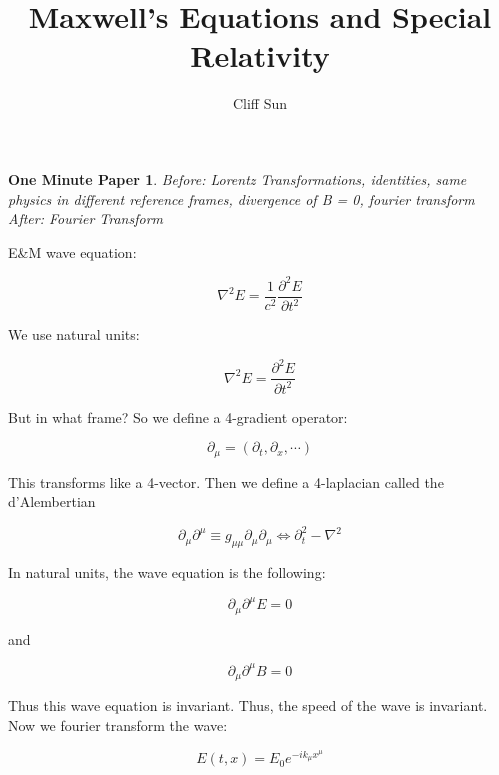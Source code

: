 \documentclass{article}
\title{Maxwell's Equations and Special Relativity}
\author{Cliff Sun}
\newtheorem{one minute paper}[theorem]{One Minute Paper}
\begin{document}
\maketitle

\begin{one minute paper}
    Before: Lorentz Transformations, identities, same physics in different reference frames, divergence of B = 0, fourier transform \\
    
    After: Fourier Transform
\end{one minute paper}

E\&M wave equation:

\begin{equation}
    \nabla^2E = \frac{1}{c^2}\frac{\partial^2E}{\partial t^2}
\end{equation}

We use natural units:

\begin{equation}
    \nabla^2E = \frac{\partial^2E}{\partial t^2}
\end{equation}

But in what frame? So we define a 4-gradient operator:

\begin{equation}
    \partial_\mu = (\partial_t, \partial_x, \cdots)
\end{equation}

This transforms like a 4-vector. Then we define a 4-laplacian called the d'Alembertian

\begin{equation}
    \partial_\mu \partial^\mu \equiv g_{\mu \mu} \partial_\mu \partial_\mu \iff \partial_t^2 - \nabla^2
\end{equation}

In natural units, the wave equation is the following:

\begin{equation}
    \partial_\mu\partial^\mu E  = 0
\end{equation}

and 

\begin{equation}
    \partial_\mu\partial^\mu B  = 0
\end{equation}

Thus this wave equation is invariant. Thus, the speed of the wave is invariant. Now we fourier transform the wave:

\begin{equation}
    E(t,x) = E_0e^{-ik_\mu x^\mu}
\end{equation}
\end{document}
